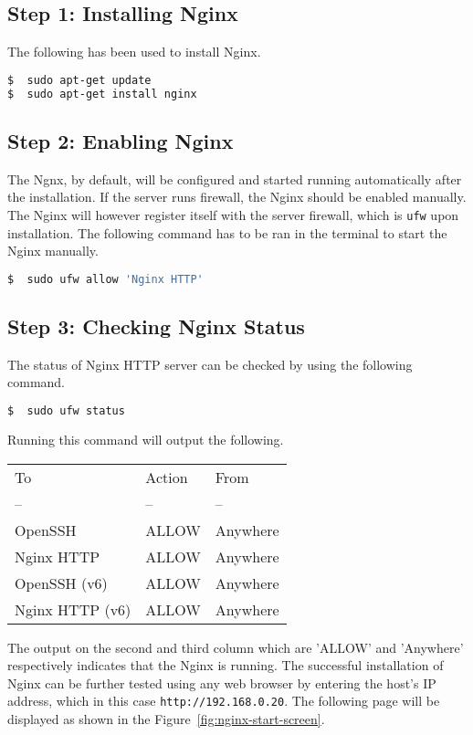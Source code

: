 \subsection*{Step 1: Installing Nginx}
The following has been used to install Nginx.
\begin{lstlisting}[language=sh]
$  sudo apt-get update
$  sudo apt-get install nginx
\end{lstlisting}

\subsection*{Step 2: Enabling Nginx}
The Ngnx, by default, will be configured and started running automatically after the installation. If the server runs firewall, the Nginx should be enabled manually. The Nginx will however register itself with the server firewall, which is \texttt{ufw} upon installation. The following command has to be ran in the terminal to start the Nginx manually.

\begin{lstlisting}[language=sh]
$  sudo ufw allow 'Nginx HTTP'
\end{lstlisting}

\subsection*{Step 3: Checking Nginx Status}
The status of Nginx HTTP server can be checked by using the following command.

\begin{lstlisting}[language=sh]
$  sudo ufw status
\end{lstlisting}

Running this command will output the following.
\begin{table}[ht]
\begin{tabular}{l l l}
To & Action & From \\
-- & -- & -- \\
OpenSSH & ALLOW & Anywhere \\
Nginx HTTP & ALLOW & Anywhere \\
OpenSSH  (v6) & ALLOW & Anywhere \\
Nginx HTTP (v6) & ALLOW & Anywhere \\
\end{tabular}
\end{table}

The output on the second and third column which are 'ALLOW' and 'Anywhere' respectively indicates that the Nginx is running. The successful installation of Nginx can be further tested using any web browser by entering the host's IP address, which in this case \texttt{http://192.168.0.20}. The following page will be displayed as shown in the Figure~\ref{fig:nginx-start-screen}.

